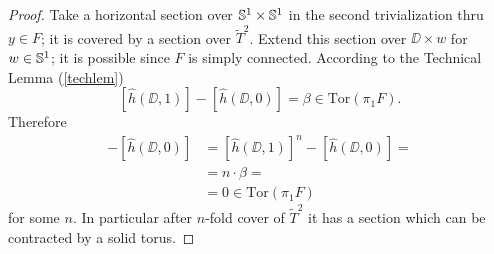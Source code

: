 \documentclass{amsart}
\begin{document}
\begin{proof}
Take a horizontal section over ${\Bbb S}^1\times {\Bbb S}^1$ in the second trivialization thru $y\in F$; 
it is covered by a section over $\widetilde T^2$. 
Extend this section over $\DD\times w$ for $w\in {\Bbb S}^1$;
it is possible since $F$ is simply connected.
According to the Technical Lemma (\ref{techlem})
\[[\hat h(\DD,1)]-[\hat h(\DD,0)]
=
\beta\in \mathrm{Tor}(\pi_1F).\]
Therefore  
\begin{align*}
[\hat h(\DD,n)]-[\hat h(\DD,0)]
&=
[\hat h(\DD,1)]^n-[\hat h(\DD,0)]=
\\&=
n{\cdot}\beta=
\\
&=0\in \mathrm{Tor}(\pi_1F)
\end{align*}
for some $n$. 
In particular after $n$-fold cover of $\widetilde T^2$ it has a section which can be contracted by a solid torus.
\end{proof}















































\small

%
\end{document}
